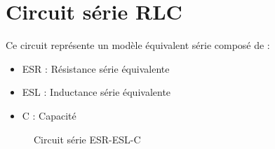 
\section{Circuit série RLC}

Ce circuit représente un modèle équivalent série composé de :
\begin{itemize}
    \item ESR : Résistance série équivalente
    \item ESL : Inductance série équivalente  
    \item C : Capacité
\end{itemize}

\begin{figure}[H]
    \centering
    \caption{Circuit série ESR-ESL-C}
    \label{fig:circuit_serie_rlc}
\end{figure}